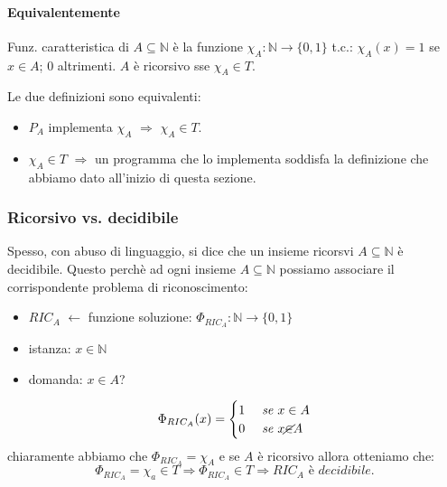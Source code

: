 \documentclass{article}
\begin{document}
\paragraph{Equivalentemente} Funz. caratteristica di $A \subseteq \mathbb{N}$ è la funzione $\chi_A:\mathbb{N}\rightarrow\{0,1\}$ t.c.: $\chi_A(x)=1$ se $x \in A$; 0 altrimenti. $A$ è ricorsivo sse $\chi_A \in T$.




Le due definizioni sono equivalenti:
\begin{itemize}
	\item $P_A$ implementa $\chi_A$ $\Rightarrow$ $\chi_A \in T$.
	\item $\chi_A \in T$ $\Rightarrow$ un programma che lo implementa soddisfa la definizione che abbiamo dato all'inizio di questa sezione.
\end{itemize}



\subsubsection{Ricorsivo vs. decidibile}
Spesso, con abuso di linguaggio, si dice che un insieme ricorsvi $A \subseteq \mathbb{N}$ è decidibile. Questo perchè ad ogni insieme $A \subseteq \mathbb{N}$ possiamo associare il corrispondente problema di riconoscimento:
\begin{itemize}
	\item $RIC_A$ $\leftarrow$ funzione soluzione: $\Phi_{RIC_A}:\mathbb{N}\rightarrow \{0,1\}$
	\item istanza: $ x \in \mathbb{N}$
	\item domanda: $x \in A$?
	
\end{itemize}
\begin{displaymath}
	\Phi_{RIC_A}(x)=\begin{cases}
		1 &\textit{ se } x \in A \\
		0 &\textit{ se } x \cancel{\in} A
	\end{cases}
\end{displaymath}
chiaramente abbiamo che $\Phi_{RIC_A}=\chi_A$ e se $A$ è ricorsivo allora otteniamo che:
\begin{displaymath}
	\Phi_{RIC_A} = \chi_a \in T \Rightarrow \Phi_{RIC_A} \in T \Rightarrow \textit{${RIC_A}$ è decidibile}.
\end{displaymath}
\end{document}
